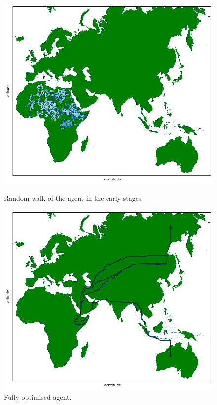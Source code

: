 \documentclass[11pt]{article}
\begin{document}
\begin{figure}[h!]
    \begin{minipage}{0.49\textwidth}
        \includegraphics[scale=0.3]{Files/Images/random.png}
        \caption{Random walk of the agent in the early stages}
    \end{minipage}
    \begin{minipage}{0.49\textwidth}
        \includegraphics[scale=0.3]{Files/Images/optimised.png}
        \caption{Fully optimised agent.}
    \end{minipage}
    

\end{figure}
\end{document}
